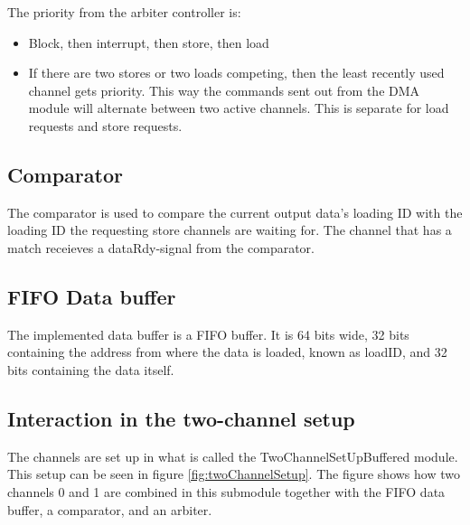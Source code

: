 \begin{appendix}
The priority from the arbiter controller is:
\begin{itemize}
    \item Block, then interrupt, then store, then load
    \item If there are two stores or two loads competing, then the least recently used channel gets priority.
    This way the commands sent out from the DMA module will alternate between two active channels. 
    This is separate for load requests and store requests.
\end{itemize}

\subsection{Comparator}
The comparator is used to compare the current output data's loading ID with the loading ID the requesting store channels are waiting for.
The channel that has a match receieves a dataRdy-signal from the comparator. 

\subsection{FIFO Data buffer}
The implemented data buffer is a FIFO buffer.
It is 64 bits wide, 32 bits containing the address from where the data is loaded, known as loadID, and 32 bits containing the data itself.

\subsection{Interaction in the two-channel setup}
The channels are set up in what is called the TwoChannelSetUpBuffered module.
This setup can be seen in figure \ref{fig:twoChannelSetup}.
The figure shows how two channels 0 and 1 are combined in this submodule together with the FIFO data buffer, a comparator, and an arbiter.


\end{appendix}

